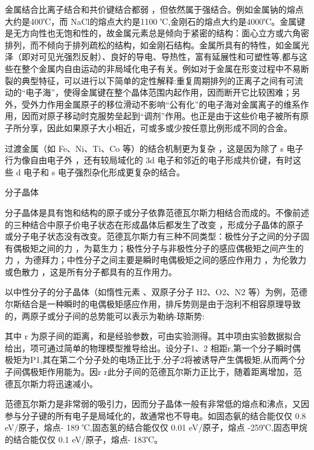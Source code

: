 金属结合比离子结合和共价键结合都弱 ，但依然属于强结合。例如金属钠的熔点大约是400℃，而 NaCl的熔点大约是1100 ℃,金刚石的熔点大约是4000℃。金属键是无方向性也无饱和性的，故金属元素总是倾向于紧密的结构：面心立方或六角密排列，而不倾向于排列疏松的结构，如金刚石结构。金属所具有的特性，如金属光泽（即对可见光强烈反射）、良好的导电、导热性，富有延展性和可塑性等,都与这些在整个金属内自由运动的非局域化电子有关。例如对于金属在形变过程中不易断裂的典型特征，可以进行以下简单的定性解释:重复周期排列的正离子之间有可流动的“电子海”，使得金属键在整个晶体范围内起作用，因而断开它比较困难；另外，受外力作用金属原子的移位滑动不影响“公有化”的电子海对金属离子的维系作用，因而对原子移动时克服势垒起到“调剂”作用。也正是由于这些价电子被所有原子所分享，因此如果原子大小相近，可或多或少按任意比例形成不同的合金。

过渡金属（如 Fe、Ni、Ti、Co 等）的结合机制更为复杂 ，这是因为除了 s 电子行为像自由电子外 ，还有较局域化的 3d 电子和邻近的电子形成共价键，有时这些 d 电子和 s 电子强烈杂化形成更复杂的结合。

分子晶体

分子晶体是具有饱和结构的原子或分子依靠范德瓦尔斯力相结合而成的。不像前述的三种结合中原子价电子状态在形成晶体后都发生了改变 ，形成分子晶体的原子或分子电子状态没有改变。范德瓦尔斯力有三种不同类型：极性分子之间的分子固有偶极矩之间的力 ，为葛生力；极性分子与非极性分子的感应偶极矩之间产生的力 ，为德拜力；中性分子之间主要是瞬时电偶极矩之间的感应作用力 ，为伦敦力或色散力 ，这是所有分子都具有的互作用力。

以中性分子的分子晶体（如惰性元素 、双原子分子 H2、O2、N2 等）为例，范德尔斯结合是一种瞬时的电偶极矩感应作用，排斥势则是由于泡利不相容原理导致的，两原子或分子间的总势能可以表示为勒纳-琼斯势:



其中 r 为原子间的距离，和是经验参数，可由实验测得。其中项由实验数据拟合给出，项可通过简单的物理模型推导给出。设分子1、2 相距r,第一个分子瞬时偶极矩为P1,其在第二个分子处的电场正比于,分子2将被诱导产生偶极矩,从而两个分子间偶极矩作用能为。因r r此分子间的范德瓦尔斯力正比于，随着距离增加，范德瓦尔斯力将迅速减小。

    范德瓦尔斯力是非常弱的吸引力，因而分子晶体一般有非常低的熔点和沸点，又因参与分子键的所有电子是局域化的，故通常也不导电。如固态氨的结合能仅仅 0.8 eV/原子，熔点- 189 ℃,固态氢的结合能仅仅 0.01 eV/原子，熔点 -259℃,固态甲烷的结合能仅仅 0.1 eV/原子，熔点- 183℃。

